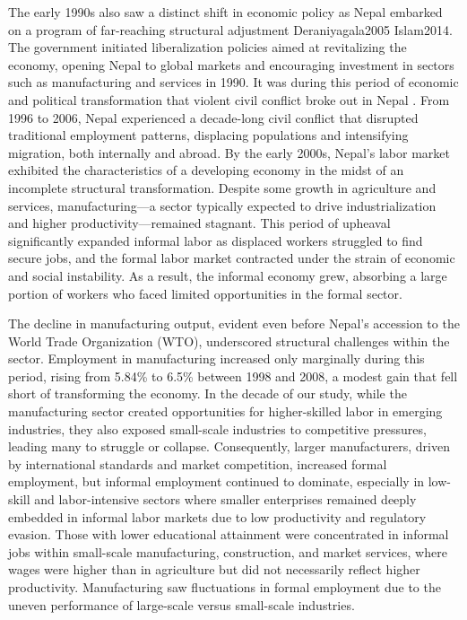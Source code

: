 The early 1990s also saw a distinct shift in economic policy as Nepal embarked on a program of far-reaching structural adjustment  Deraniyagala2005 \parencite{Bulmer2020} Islam2014. The government initiated liberalization policies aimed at revitalizing the economy, opening Nepal to global markets and encouraging investment in sectors such as manufacturing and services in 1990. It was during this period of economic and political transformation that violent civil conﬂict broke out in Nepal . From 1996 to 2006, Nepal experienced a decade-long civil conflict that disrupted traditional employment patterns, displacing populations and intensifying migration, both internally and abroad. By the early 2000s, Nepal's labor market exhibited the characteristics of a developing economy in the midst of an incomplete structural transformation. Despite some growth in agriculture and services, manufacturing—a sector typically expected to drive industrialization and higher productivity—remained stagnant.  This period of upheaval significantly expanded informal labor as displaced workers struggled to find secure jobs, and the formal labor market contracted under the strain of economic and social instability. As a result, the informal economy grew, absorbing a large portion of workers who faced limited opportunities in the formal sector. 

The decline in manufacturing output, evident even before Nepal's accession to the World Trade Organization (WTO), underscored structural challenges within the sector. Employment in manufacturing increased only marginally during this period, rising from 5.84\% to 6.5\% between 1998 and 2008, a modest gain that fell short of transforming the economy. In the decade of our study, while the manufacturing sector created opportunities for higher-skilled labor in emerging industries, they also exposed small-scale industries to competitive pressures, leading many to struggle or collapse.  Consequently, larger manufacturers, driven by international standards and market competition, increased formal employment, but informal employment continued to dominate, especially in low-skill and labor-intensive sectors where smaller enterprises remained deeply embedded in informal labor markets due to low productivity and regulatory evasion. Those with lower educational attainment were concentrated in informal jobs within small-scale manufacturing, construction, and market services, where wages were higher than in agriculture but did not necessarily reflect higher productivity. Manufacturing saw fluctuations in formal employment due to the uneven performance of large-scale versus small-scale industries. 


